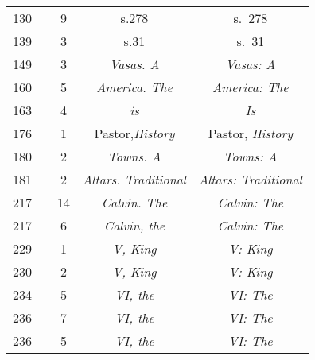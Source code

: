 \documentclass[a4paper,11pt]{article}
\begin{document}
\begin{center}
\begin{tabular}{|c|c|c|c|c|}
    130 & &  9 & s.278 & s.~278 \\
    139 & &  3 & s.31 & s.~31 \\
    149 & &  3 & \emph{Vasas. A} & \emph{Vasas: A} \\
    160 & &  5 & \emph{America. The} & \emph{America: The} \\
    163 & &  4 & \emph{is} & \emph{Is} \\
    176 & &  1 & Pastor,\emph{History} & Pastor, \emph{History} \\
    180 & &  2 & \emph{Towns. A} & \emph{Towns: A} \\
    181 & &  2 & \emph{Altars. Traditional} & \emph{Altars: Traditional} \\
    217 & & 14 & \emph{Calvin. The} & \emph{Calvin: The} \\
    217 & &  6 & \emph{Calvin, the} & \emph{Calvin: The} \\
    229 & &  1 & \emph{V, King} & \emph{V: King} \\
    230 & &  2 & \emph{V, King} & \emph{V: King} \\
    234 & &  5 & \emph{VI, the} & \emph{VI: The} \\
    236 & &  7 & \emph{VI, the} & \emph{VI: The} \\
    236 & &  5 & \emph{VI, the} & \emph{VI: The} \\
    \hline
  \end{tabular}


\end{center}
\end{document}
